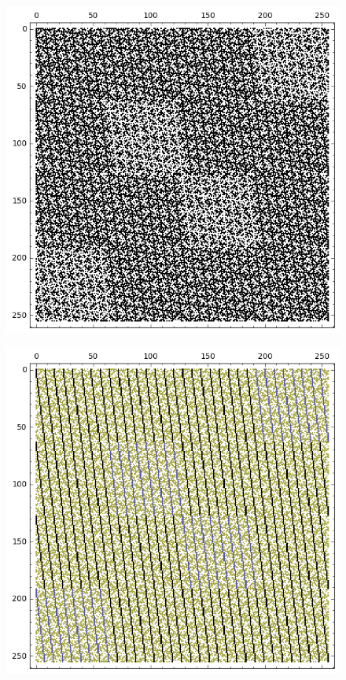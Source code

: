 \documentclass[12pt,a4paper]{article}
\begin{document}
\begin{figure}[!hb]
\centering
\begin{minipage}{.48\textwidth}
  \centering
  \includegraphics[width=.9\linewidth]{../matrix_plot/re8_2_weight_class_matrix.png}
  \label{fig:8_2_weight_class_matrix}
\end{minipage}%
\begin{minipage}{.48\textwidth}
  \centering
  \includegraphics[width=.9\linewidth]{../matrix_plot/re8_2_bent_cayley_graph_index_matrix.png}
  \label{fig:8_2_bent_cayley_graph_index_matrix}
\end{minipage}
\end{figure}
~
\end{document}
